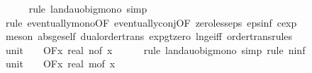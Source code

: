 \begin{isabellebody}
\ \ \ \ \isamarkupfalse%
\ {\isacharparenleft}{\kern0pt}rule\ landau{\isacharunderscore}{\kern0pt}o{\isachardot}{\kern0pt}big{\isacharunderscore}{\kern0pt}mono{\isacharcomma}{\kern0pt}\ simp{\isacharparenright}{\kern0pt}\isanewline
\ \ \ \ \isamarkupfalse%
\ {\isacharparenleft}{\kern0pt}rule\ eventually{\isacharunderscore}{\kern0pt}mono{\isacharbrackleft}{\kern0pt}OF\ eventually{\isacharunderscore}{\kern0pt}conj{\isacharbrackleft}{\kern0pt}OF\ zero{\isacharunderscore}{\kern0pt}less{\isacharunderscore}{\kern0pt}eps\ eps{\isacharunderscore}{\kern0pt}inf{\isacharbrackleft}{\kern0pt}\ c{\isacharequal}{\kern0pt}{\isachardoublequoteopen}exp\ {}{\isachardoublequoteclose}{\isacharbrackright}{\kern0pt}{\isacharbrackright}{\kern0pt}{\isacharbrackright}{\kern0pt}{\isacharparenright}{\kern0pt}\isanewline
\ \ \ \ \isamarkupfalse%
\ {\isacharparenleft}{\kern0pt}meson\ abs{\isacharunderscore}{\kern0pt}ge{\isacharunderscore}{\kern0pt}self\ dual{\isacharunderscore}{\kern0pt}order{\isachardot}{\kern0pt}trans\ exp{\isacharunderscore}{\kern0pt}gt{\isacharunderscore}{\kern0pt}zero\ ln{\isacharunderscore}{\kern0pt}ge{\isacharunderscore}{\kern0pt}iff\ order{\isacharunderscore}{\kern0pt}trans{\isacharunderscore}{\kern0pt}rules{\isacharparenleft}{\kern0pt}{}{}{\isacharparenright}{\kern0pt}{\isacharparenright}{\kern0pt}\isanewline
\isanewline
\ \ \isamarkupfalse%
\ unit{\isacharunderscore}{\kern0pt}{}{\isacharcolon}{\kern0pt}\ {\isachardoublequoteopen}{\isacharparenleft}{\kern0pt}{\isasymlambda}{\isacharunderscore}{\kern0pt}{\isachardot}{\kern0pt}\ {}{\isacharparenright}{\kern0pt}\ {\isasymin}\ O{\isacharbrackleft}{\kern0pt}{\isacharquery}{\kern0pt}F{\isacharbrackright}{\kern0pt}{\isacharparenleft}{\kern0pt}{\isasymlambda}x{\isachardot}{\kern0pt}\ real\ {\isacharparenleft}{\kern0pt}n{\isacharunderscore}{\kern0pt}of\ x{\isacharparenright}{\kern0pt}{\isacharparenright}{\kern0pt}{\isachardoublequoteclose}\isanewline
\ \ \ \ \isamarkupfalse%
\ {\isacharparenleft}{\kern0pt}rule\ landau{\isacharunderscore}{\kern0pt}o{\isachardot}{\kern0pt}big{\isacharunderscore}{\kern0pt}mono{\isacharcomma}{\kern0pt}\ simp{\isacharcomma}{\kern0pt}\ rule\ n{\isacharunderscore}{\kern0pt}inf{\isacharparenright}{\kern0pt}\isanewline
\isanewline
\ \ \isamarkupfalse%
\ unit{\isacharunderscore}{\kern0pt}{}{\isacharcolon}{\kern0pt}\ {\isachardoublequoteopen}{\isacharparenleft}{\kern0pt}{\isasymlambda}{\isacharunderscore}{\kern0pt}{\isachardot}{\kern0pt}\ {}{\isacharparenright}{\kern0pt}\ {\isasymin}\ O{\isacharbrackleft}{\kern0pt}{\isacharquery}{\kern0pt}F{\isacharbrackright}{\kern0pt}{\isacharparenleft}{\kern0pt}{\isasymlambda}x{\isachardot}{\kern0pt}\ real\ {\isacharparenleft}{\kern0pt}m{\isacharunderscore}{\kern0pt}of\ x{\isacharparenright}{\kern0pt}{\isacharparenright}{\kern0pt}{\isachardoublequoteclose}\isanewline

\end{isabellebody}
